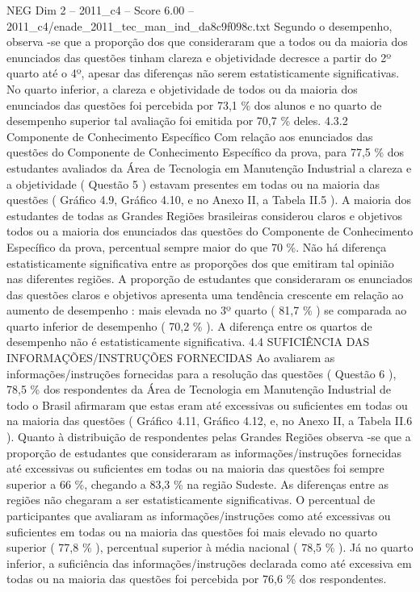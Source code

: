 \begin{textsample}{NEG Dim 2 – 2011\_c4 – Score 6.00 – 2011\_c4/enade\_2011\_tec\_man\_ind\_da8c9f098c.txt}
Segundo o desempenho, observa -se que a proporção dos que consideraram que a todos ou da maioria dos enunciados das questões tinham clareza e objetividade decresce a partir do 2º quarto até o 4º, apesar das diferenças não serem estatisticamente significativas.
No quarto inferior, a clareza e objetividade de todos ou da maioria dos enunciados das questões foi percebida por 73,1 \% dos alunos e no quarto de desempenho superior tal avaliação foi emitida por 70,7 \% deles. 4.3.2 Componente de Conhecimento Específico Com relação aos enunciados das questões do Componente de Conhecimento Específico da prova, para 77,5 \% dos estudantes avaliados da Área de Tecnologia em Manutenção Industrial a clareza e a objetividade ( Questão 5 ) estavam presentes em todas ou na maioria das questões ( Gráfico 4.9, Gráfico 4.10, e no Anexo II, a Tabela II.5 ).
A maioria dos estudantes de todas as Grandes Regiões brasileiras considerou claros e objetivos todos ou a maioria dos enunciados das questões do Componente de Conhecimento Específico da prova, percentual sempre maior do que 70 \%.
Não há diferença estatisticamente significativa entre as proporções dos que emitiram tal opinião nas diferentes regiões.
A proporção de estudantes que consideraram os enunciados das questões claros e objetivos apresenta uma tendência crescente em relação ao aumento de desempenho : mais elevada no 3º quarto ( 81,7 \% ) se comparada ao quarto inferior de desempenho ( 70,2 \% ).
A diferença entre os quartos de desempenho não é estatisticamente significativa. 4.4 SUFICIÊNCIA DAS INFORMAÇÕES/INSTRUÇÕES FORNECIDAS Ao avaliarem as informações/instruções fornecidas para a resolução das questões ( Questão 6 ), 78,5 \% dos respondentes da Área de Tecnologia em Manutenção Industrial de todo o Brasil afirmaram que estas eram até excessivas ou suficientes em todas ou na maioria das questões ( Gráfico 4.11, Gráfico 4.12, e, no Anexo II, a Tabela II.6 ).
Quanto à distribuição de respondentes pelas Grandes Regiões observa -se que a proporção de estudantes que consideraram as informações/instruções fornecidas até excessivas ou suficientes em todas ou na maioria das questões foi sempre superior a 66 \%, chegando a 83,3 \% na região Sudeste.
As diferenças entre as regiões não chegaram a ser estatisticamente significativas.
O percentual de participantes que avaliaram as informações/instruções como até excessivas ou suficientes em todas ou na maioria das questões foi mais elevado no quarto superior ( 77,8 \% ), percentual superior à média nacional ( 78,5 \% ).
Já no quarto inferior, a suficiência das informações/instruções declarada como até excessiva em todas ou na maioria das questões foi percebida por 76,6 \% dos respondentes.

\end{textsample}
